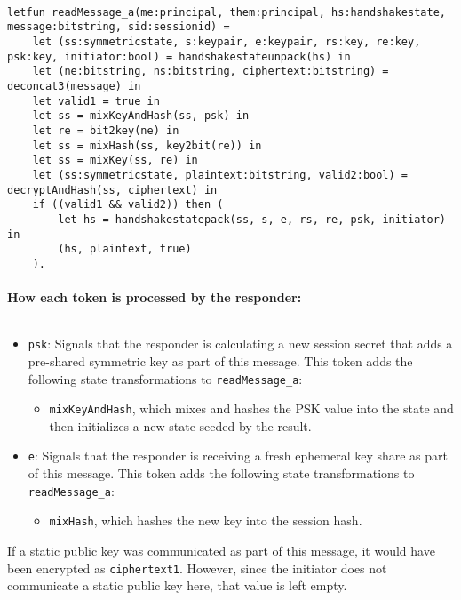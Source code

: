 \begin{lstlisting}

letfun readMessage_a(me:principal, them:principal, hs:handshakestate, message:bitstring, sid:sessionid) =
	let (ss:symmetricstate, s:keypair, e:keypair, rs:key, re:key, psk:key, initiator:bool) = handshakestateunpack(hs) in
	let (ne:bitstring, ns:bitstring, ciphertext:bitstring) = deconcat3(message) in
	let valid1 = true in
	let ss = mixKeyAndHash(ss, psk) in
	let re = bit2key(ne) in
	let ss = mixHash(ss, key2bit(re)) in
	let ss = mixKey(ss, re) in
	let (ss:symmetricstate, plaintext:bitstring, valid2:bool) = decryptAndHash(ss, ciphertext) in
	if ((valid1 && valid2)) then (
		let hs = handshakestatepack(ss, s, e, rs, re, psk, initiator) in
		(hs, plaintext, true)
	).

\end{lstlisting}

\paragraph{How each token is processed by the responder:}$ $

\begin{itemize}

\item \texttt{psk}: Signals that the responder is calculating a new session secret that adds a pre-shared symmetric key as part of this message. This token adds the following state transformations to \texttt{readMessage\_a}:
\begin{itemize}

\item  \texttt{mixKeyAndHash}, which mixes and hashes the PSK value into the state and then initializes a new state seeded by the result.
\end{itemize}


\item \texttt{e}: Signals that the responder is receiving a fresh ephemeral key share as part of this message. This token adds the following state transformations to \texttt{readMessage\_a}:
\begin{itemize}

\item \texttt{mixHash}, which hashes the new key into the session hash.
\end{itemize}


\end{itemize}
If a static public key was communicated as part of this message, it would have been encrypted as \texttt{ciphertext1}. However, since the initiator does not communicate a static public key here, that value is left empty.


